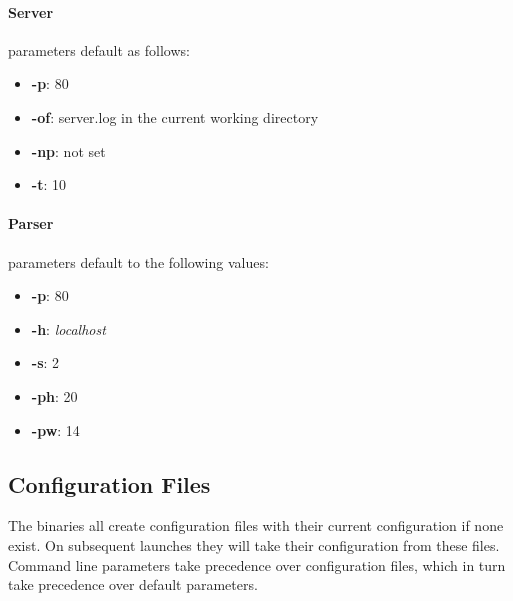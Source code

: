 \paragraph{Server} parameters default as follows:
\begin{itemize}
    \item \textbf{-p}: 80
    \item \textbf{-of}: server.log in the current working directory
    \item \textbf{-np}: not set
    \item \textbf{-t}: 10
\end{itemize}

\paragraph{Parser} parameters default to the following values:
\begin{itemize}
    \item \textbf{-p}: 80
    \item \textbf{-h}: \textit{localhost}
    \item \textbf{-s}: 2
    \item \textbf{-ph}: 20
    \item \textbf{-pw}: 14
\end{itemize}

\subsection*{Configuration Files}
The binaries all create configuration files with their current configuration if none exist.
On subsequent launches they will take their configuration from these files.
Command line parameters take precedence over configuration files, which in turn take precedence over default parameters.
